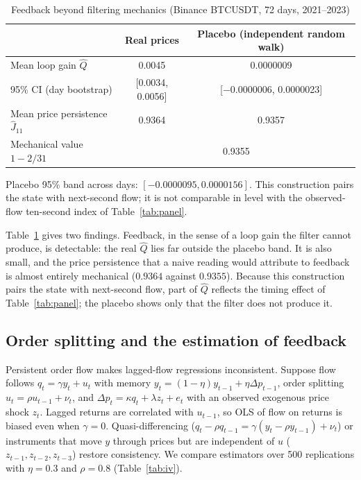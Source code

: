 \begin{table}[t]\centering
\begin{threeparttable}
\caption{Feedback beyond filtering mechanics (Binance BTCUSDT, 72 days, 2021--2023)}\label{tab:feedback}
\begin{tabular}{lcc}
\toprule
 & Real prices & Placebo (independent random walk)\\
\midrule
Mean loop gain $\hat Q$ & 0.0045 & 0.0000009\\
95\% CI (day bootstrap) & [0.0034, 0.0056] & [$-$0.0000006, 0.0000023]\\
Mean price persistence $\hat J_{11}$ & 0.9364 & 0.9357\\
Mechanical value $1-2/31$ & \multicolumn{2}{c}{0.9355}\\
\bottomrule
\end{tabular}
\begin{tablenotes}\footnotesize\item Placebo 95\% band across days: $[-0.0000095,0.0000156]$. This construction pairs the state with next-second flow; it is not comparable in level with the observed-flow ten-second index of Table~\ref{tab:panel}.\end{tablenotes}
\end{threeparttable}
\end{table}

Table~\ref{tab:feedback} gives two findings. Feedback, in the sense of a loop gain the filter cannot produce, is detectable: the real $\hat Q$ lies far outside the placebo band. It is also small, and the price persistence that a naive reading would attribute to feedback is almost entirely mechanical ($0.9364$ against $0.9355$). Because this construction pairs the state with next-second flow, part of $\hat Q$ reflects the timing effect of Table~\ref{tab:panel}; the placebo shows only that the filter does not produce it.

\subsection{Order splitting and the estimation of feedback}

Persistent order flow makes lagged-flow regressions inconsistent. Suppose flow follows $q_t=\gamma y_t+u_t$ with memory $y_t=(1-\eta)y_{t-1}+\eta\Delta p_{t-1}$, order splitting $u_t=\rho u_{t-1}+\nu_t$, and $\Delta p_t=\kappa q_t+\lambda z_t+e_t$ with an observed exogenous price shock $z_t$. Lagged returns are correlated with $u_{t-1}$, so OLS of flow on returns is biased even when $\gamma=0$. Quasi-differencing ($q_t-\rho q_{t-1}=\gamma(y_t-\rho y_{t-1})+\nu_t$) or instruments that move $y$ through prices but are independent of $u$ ($z_{t-1},z_{t-2},z_{t-3}$) restore consistency. We compare estimators over 500 replications with $\eta=0.3$ and $\rho=0.8$ (Table~\ref{tab:iv}).

